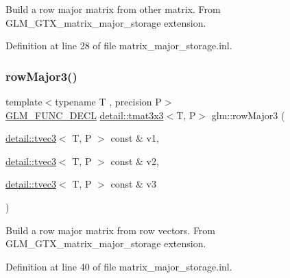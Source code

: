 Build a row major matrix from other matrix. From G\+L\+M\+\_\+\+G\+T\+X\+\_\+matrix\+\_\+major\+\_\+storage extension. 

Definition at line 28 of file matrix\+\_\+major\+\_\+storage.\+inl.

\mbox{\label{group__gtx__matrix__major__storage_gaacbbf46215dff1c3da9599916ba04a94}} 
\subsubsection{\texorpdfstring{row\+Major3()}{rowMajor3()}\hspace{0.1cm}{\footnotesize\ttfamily [1/2]}}
{\footnotesize\ttfamily template$<$typename T , precision P$>$ \\
\hyperlink{setup_8hpp_ab2d052de21a70539923e9bcbf6e83a51}{G\+L\+M\+\_\+\+F\+U\+N\+C\+\_\+\+D\+E\+CL} \hyperlink{structglm_1_1detail_1_1tmat3x3}{detail\+::tmat3x3}$<$T, P$>$ glm\+::row\+Major3 (\begin{DoxyParamCaption}\item[{\hyperlink{structglm_1_1detail_1_1tvec3}{detail\+::tvec3}$<$ T, P $>$ const \&}]{v1,  }\item[{\hyperlink{structglm_1_1detail_1_1tvec3}{detail\+::tvec3}$<$ T, P $>$ const \&}]{v2,  }\item[{\hyperlink{structglm_1_1detail_1_1tvec3}{detail\+::tvec3}$<$ T, P $>$ const \&}]{v3 }\end{DoxyParamCaption})}

Build a row major matrix from row vectors. From G\+L\+M\+\_\+\+G\+T\+X\+\_\+matrix\+\_\+major\+\_\+storage extension. 

Definition at line 40 of file matrix\+\_\+major\+\_\+storage.\+inl.

\mbox{\label{group__gtx__matrix__major__storage_gafb5e7381b2451a85db394c457c284fb7}} 
